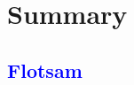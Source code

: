     \section{\pCf}
    \label{sect:pCf}


    \section{Summary}
    \label{sect:sum}


        \ifboyscout\textcolor{blue}{
    \section{Flotsam}

        }\fi %


            


